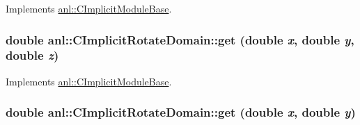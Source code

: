 Implements \hyperlink{classanl_1_1CImplicitModuleBase_a3cf520bdab59631864253c03b4e1723f}{anl::CImplicitModuleBase}.\hypertarget{classanl_1_1CImplicitRotateDomain_a45697c6d5fcd6d5b551219a5520d0db8}{
\subsubsection[{get}]{\setlength{\rightskip}{0pt plus 5cm}double anl::CImplicitRotateDomain::get (double {\em x}, \/  double {\em y}, \/  double {\em z})}}
\label{classanl_1_1CImplicitRotateDomain_a45697c6d5fcd6d5b551219a5520d0db8}


Implements \hyperlink{classanl_1_1CImplicitModuleBase_ac17d592612c82ba3d47f9229a00b1fe3}{anl::CImplicitModuleBase}.\hypertarget{classanl_1_1CImplicitRotateDomain_a9599a3b576c39197f6807202c7679480}{
\subsubsection[{get}]{\setlength{\rightskip}{0pt plus 5cm}double anl::CImplicitRotateDomain::get (double {\em x}, \/  double {\em y})}}
\label{classanl_1_1CImplicitRotateDomain_a9599a3b576c39197f6807202c7679480}


